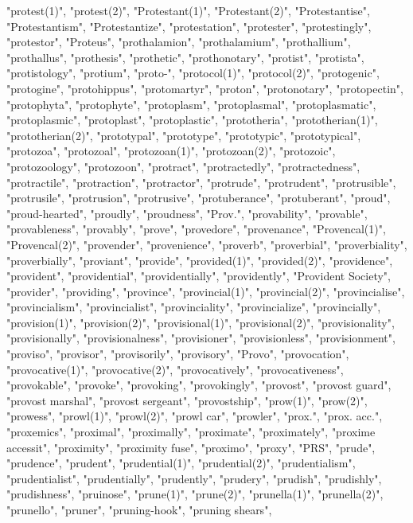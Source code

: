 "protest(1)",
"protest(2)",
"Protestant(1)",
"Protestant(2)",
"Protestantise",
"Protestantism",
"Protestantize",
"protestation",
"protester",
"protestingly",
"protestor",
"Proteus",
"prothalamion",
"prothalamium",
"prothallium",
"prothallus",
"prothesis",
"prothetic",
"prothonotary",
"protist",
"protista",
"protistology",
"protium",
"proto-",
"protocol(1)",
"protocol(2)",
"protogenic",
"protogine",
"protohippus",
"protomartyr",
"proton",
"protonotary",
"protopectin",
"protophyta",
"protophyte",
"protoplasm",
"protoplasmal",
"protoplasmatic",
"protoplasmic",
"protoplast",
"protoplastic",
"prototheria",
"prototherian(1)",
"prototherian(2)",
"prototypal",
"prototype",
"prototypic",
"prototypical",
"protozoa",
"protozoal",
"protozoan(1)",
"protozoan(2)",
"protozoic",
"protozoology",
"protozoon",
"protract",
"protractedly",
"protractedness",
"protractile",
"protraction",
"protractor",
"protrude",
"protrudent",
"protrusible",
"protrusile",
"protrusion",
"protrusive",
"protuberance",
"protuberant",
"proud",
"proud-hearted",
"proudly",
"proudness",
"Prov.",
"provability",
"provable",
"provableness",
"provably",
"prove",
"provedore",
"provenance",
"Provencal(1)",
"Provencal(2)",
"provender",
"provenience",
"proverb",
"proverbial",
"proverbiality",
"proverbially",
"proviant",
"provide",
"provided(1)",
"provided(2)",
"providence",
"provident",
"providential",
"providentially",
"providently",
"Provident Society",
"provider",
"providing",
"province",
"provincial(1)",
"provincial(2)",
"provincialise",
"provincialism",
"provincialist",
"provinciality",
"provincialize",
"provincially",
"provision(1)",
"provision(2)",
"provisional(1)",
"provisional(2)",
"provisionality",
"provisionally",
"provisionalness",
"provisioner",
"provisionless",
"provisionment",
"proviso",
"provisor",
"provisorily",
"provisory",
"Provo",
"provocation",
"provocative(1)",
"provocative(2)",
"provocatively",
"provocativeness",
"provokable",
"provoke",
"provoking",
"provokingly",
"provost",
"provost guard",
"provost marshal",
"provost sergeant",
"provostship",
"prow(1)",
"prow(2)",
"prowess",
"prowl(1)",
"prowl(2)",
"prowl car",
"prowler",
"prox.",
"prox. acc.",
"proxemics",
"proximal",
"proximally",
"proximate",
"proximately",
"proxime accessit",
"proximity",
"proximity fuse",
"proximo",
"proxy",
"PRS",
"prude",
"prudence",
"prudent",
"prudential(1)",
"prudential(2)",
"prudentialism",
"prudentialist",
"prudentially",
"prudently",
"prudery",
"prudish",
"prudishly",
"prudishness",
"pruinose",
"prune(1)",
"prune(2)",
"prunella(1)",
"prunella(2)",
"prunello",
"pruner",
"pruning-hook",
"pruning shears",
